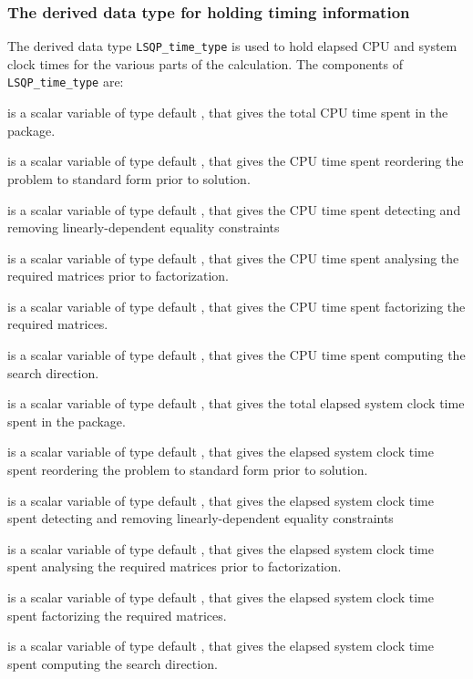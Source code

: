 \documentclass{galahad}
\newcommand{\packagename}{LSQP}
\begin{document}

\subsubsection{The derived data type for holding timing 
 information}\label{typetime}
The derived data type 
{\tt \packagename\_time\_type} 
is used to hold elapsed CPU and system clock times for the various parts of 
the calculation. The components of 
{\tt \packagename\_time\_type} 
are:
\begin{description}
 is a scalar variable of type default \realdp, that gives
 the total CPU time spent in the package.

 is a scalar variable of type default \realdp, that gives
 the CPU time spent reordering the problem to standard form prior to solution.

 is a scalar variable of type default \realdp, that gives
 the CPU time spent detecting and removing linearly-dependent equality 
constraints

 is a scalar variable of type default \realdp, that gives
 the CPU time spent analysing the required matrices prior to factorization.

 is a scalar variable of type default \realdp, that gives
 the CPU time spent factorizing the required matrices.

 is a scalar variable of type default \realdp, that gives
 the CPU time spent computing the search direction.

 is a scalar variable of type default \realdp, that gives
 the total elapsed system clock time spent in the package.

 is a scalar variable of type default \realdp, that gives
 the elapsed system clock time spent reordering the problem to standard form 
prior to solution.

 is a scalar variable of type default \realdp, that 
gives  the elapsed system clock time spent detecting and removing 
linearly-dependent equality 
 constraints

 is a scalar variable of type default \realdp, that gives
 the elapsed system clock time spent analysing the required matrices prior to 
factorization.

 is a scalar variable of type default \realdp, that gives
 the elapsed system clock time spent factorizing the required matrices.

 is a scalar variable of type default \realdp, that gives
 the elapsed system clock time spent computing the search direction.

\end{description}
\end{document}
